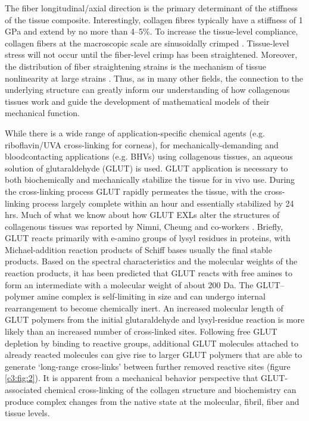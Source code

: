     
    The fiber longitudinal/axial direction is the primary determinant of the stiffness of the tissue composite. Interestingly, collagen fibres typically have a stiffness of 1 GPa \cite{shen_stress_2008,gentleman_mechanical_2003,eppell_nano_2006,yang_mechanical_2008} and extend by no more than 4–5\%. 
    To increase the tissue-level compliance, collagen fibers at the macroscopic scale are sinusoidally crimped \cite{parry_molecular_1988}. Tissue-level stress will not occur until the fiber-level crimp has been straightened. Moreover, the distribution of fiber straightening strains is the mechanism of tissue nonlinearity at large strains \cite{lanir_constitutive_1983,sacks_multiaxial_2003}. Thus, as in many other fields, the connection to the underlying structure can greatly inform our understanding of how collagenous tissues work and guide the development of mathematical models of their mechanical function.


    While there is a wide range of application-specific chemical agents (e.g. riboflavin/UVA cross-linking for corneas), for mechanically-demanding and blood\Hyphdash contacting applications (e.g. BHVs) using collagenous tissues, an aqueous solution of glutaraldehyde (GLUT) is used. GLUT application is necessary to both biochemically and mechanically stabilize the tissue for in vivo use. During the cross-linking process GLUT rapidly permeates the tissue, with the cross-linking process largely complete within an hour and essentially stabilized by 24 hrs. Much of what we know about how GLUT EXLs alter the structures of collagenous tissues was reported by Nimni, Cheung and co-workers \cite{cheung_mechanism_1990,nimni_chemically_1987,cheung_mechanism_1985,gendler_toxic_1984,cheung_presence_1983,cheung_mechanism_1982,cheung_mechanism_1982II}. Briefly, GLUT reacts primarily with e-amino groups of lysyl residues in proteins, with Michael-addition reaction products of Schiff bases usually the final stable products. Based on the spectral characteristics and the molecular weights of the reaction products, it has been predicted that GLUT reacts with free amines to form an intermediate with a molecular weight of about 200 Da. The GLUT–polymer amine complex is self-limiting in size and can undergo internal rearrangement to become chemically inert. An increased molecular length of GLUT polymers from the initial glutaraldehyde and lysyl-residue reaction is more likely than an increased number of cross-linked sites. Following free GLUT depletion by binding to reactive groups, additional GLUT molecules attached to already reacted molecules can give rise to larger GLUT polymers that are able to generate ‘long-range cross-links’ between further removed reactive sites (figure \ref{c3:fig:2}). It is apparent from a mechanical behavior perspective that GLUT-associated chemical cross-linking of the collagen structure and biochemistry can produce complex changes from the native state at the molecular, fibril, fiber and tissue levels.
    
